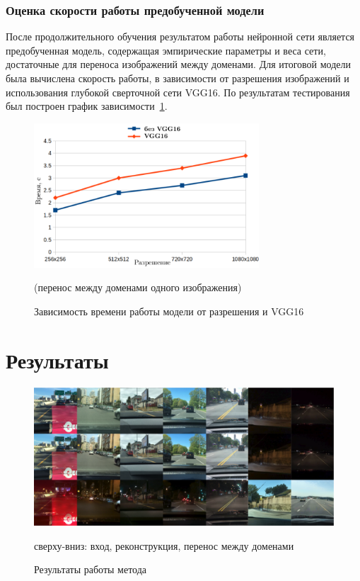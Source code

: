 \documentclass[11pt,a4paper]{extarticle}
\begin{document}
{		\vspace{-1.5em}
		\subsubsection*{Оценка скорости работы предобученной модели}\label{sec:eval:speed}

			После продолжительного обучения результатом работы нейронной сети является предобученная модель, содержащая эмпирические параметры и веса сети, достаточные для переноса изображений между доменами.
			Для итоговой модели была вычислена скорость работы, в зависимости от разрешения изображений и использования глубокой сверточной сети VGG16.
			По результатам тестирования был построен график зависимости~\ref{pic:speedtest}.
		\newpage
			\begin{figure}[ht]
				\centering
				\includegraphics[width=0.75\textwidth]{img/speedtest}
				\caption{Зависимость времени работы модели от разрешения и VGG16}{
					(перенос между доменами одного изображения)
				}
				\label{pic:speedtest}
			\end{figure}
			
	\newpage
	\section{Результаты}\label{sec:results}

		\begin{figure}[ht]
			\centering
			\includegraphics[width=\textwidth]{img/results}
			\caption{Результаты работы метода}{
				\small{
					сверху-вниз: вход, реконструкция, перенос между доменами
				}
			}
			\label{pic:results}
		\end{figure}

}
\end{document}
